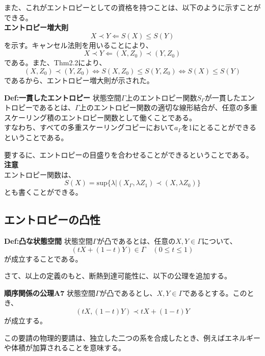 \documentclass[a4paper,11pt]{jsarticle}
\begin{document}
また、これがエントロピーとしての資格を持つことは、以下のように示すことができる。\\
\textbf{エントロピー増大則}\\
\begin{equation}
    X \prec Y \Leftarrow S(X) \leq S(Y)
\end{equation}
を示す。キャンセル法則を用いることにより、
\begin{equation}
    X \prec Y \Leftarrow (X,Z_0) \prec (Y,Z_0)
\end{equation}
である。また、Thm2.2により、
\begin{equation}
    (X,Z_0) \prec (Y,Z_0) \Leftrightarrow S(X,Z_0) \leq S(Y,Z_0) \Leftrightarrow S(X) \leq S(Y)
\end{equation}
であるから、エントロピー増大則が示された。\hfill\qedsymbol\\

\begin{itembox}[l]{\textbf{Def:一貫したエントロピー}}
    状態空間$\Gamma$上のエントロピー関数$S_{\Gamma}$が一貫したエントロピーであるとは、$\Gamma$上のエントロピー関数の適切な線形結合が、任意の多重スケーリング積のエントロピー関数として働くことである。\\
    すなわち、すべての多重スケーリングコピーにおいて$a_{\Gamma}$を1にとることができるということである。
\end{itembox}
要するに、エントロピーの目盛りを合わせることができるということである。\\

\textbf{注意}\\
エントロピー関数は、
\begin{equation}
    S(X) =\text{sup}\{\lambda|(X_{\Gamma},\lambda Z_1)\prec (X,\lambda Z_0)\}
\end{equation}
とも書くことができる。\\

\subsection{エントロピーの凸性}
\begin{itembox}[l]{\textbf{Def:凸な状態空間}}
    状態空間$\Gamma$が凸であるとは、任意の$X,Y \in \Gamma$について、
    \begin{equation}
        (tX+(1-t)Y) \in \Gamma \quad (0 \leq t \leq 1)
    \end{equation}
    が成立することである。
\end{itembox}

さて、以上の定義のもと、断熱到達可能性に、以下の公理を追加する。\\
\begin{itembox}[l]{\textbf{順序関係の公理A7}}
    状態空間$\Gamma$が凸であるとし、$X,Y \in \Gamma$であるとする。このとき、
    \begin{equation}
        (tX,(1-t)Y) \prec tX+(1-t)Y
    \end{equation}
    が成立する。
\end{itembox}
この要請の物理的要請は、独立した二つの系を合成したとき、例えばエネルギーや体積が加算されることを意味する。
\end{document}
